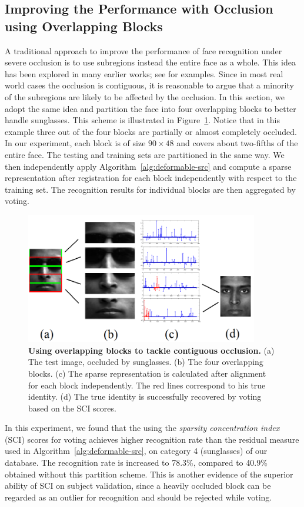 \subsection{Improving the Performance with Occlusion using Overlapping Blocks}
A traditional approach to improve the performance of face
recognition under severe occlusion is to use subregions instead
the entire face as a whole. This idea has been explored in many
earlier works; see \cite{Pentland1994-CVPR, Wright2009-PAMI}
for examples. Since in most real world cases the occlusion is contiguous, it is reasonable to argue that a minority of the
subregions are likely to be affected by the occlusion. In this
section, we adopt the same idea and partition the face into four
overlapping blocks to better handle sunglasses. This
scheme is illustrated in Figure~\ref{fig:occ-block}. Notice
that in this example three out of the four blocks are partially
or almost completely occluded. In our experiment, each block is
of size $90\times 48$ and covers about two-fifths of the entire
face. The testing and training sets are partitioned in the same
way. We then independently apply
Algorithm~\ref{alg:deformable-src} and compute a sparse
representation after registration for each block independently
with respect to the training set. The recognition
results for individual blocks are then aggregated by voting.

\begin{figure}
\centering
\includegraphics[width=4in]{figures_pami/occ_block.png}
\caption{\small{\bf Using overlapping blocks to tackle contiguous occlusion.} (a) The test image, occluded by sunglasses. (b) The four overlapping blocks. (c) The sparse representation is calculated after alignment for each block independently. The red lines correspond to his true identity. (d) The true identity is successfully recovered by voting based on the SCI scores.}
\label{fig:occ-block}
\end{figure}

In this experiment, we found that the using the \emph{sparsity
concentration index} (SCI) scores for voting achieves higher
recognition rate than the residual measure used in Algorithm~\ref{alg:deformable-src}, on
category 4 (sunglasses) of our database. The recognition rate
is increased to 78.3\%, compared to 40.9\% obtained without
this partition scheme. This is another evidence of the superior
ability of SCI on subject validation, since a heavily occluded
block can be regarded as an outlier for recognition and should
be rejected while voting.

